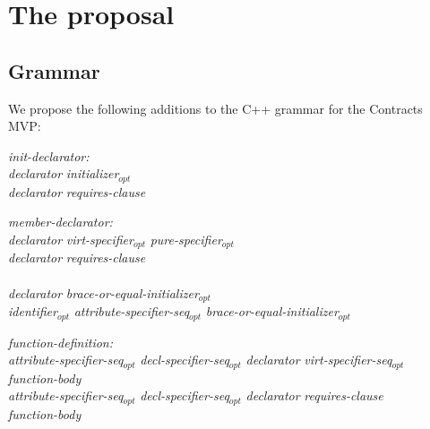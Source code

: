 
\section{The proposal}

\subsection{Grammar}

We propose the following additions to the C++ grammar for the Contracts MVP:

\begin{adjustwidth}{0.5cm}{0.5cm}

\emph{init-declarator:} \\
\phantom{~~~}\emph{declarator} \emph{initializer}$_{opt}$ \\
\phantom{~~~}\emph{declarator} \emph{requires-clause} \\
\phantom{~~~}

\emph{member-declarator:} \\
\phantom{~~~}\emph{declarator} \emph{virt-specifier}$_{opt}$ \emph{pure-specifier}$_{opt}$  \\
\phantom{~~~}\emph{declarator} \emph{requires-clause} \\
\phantom{~~~} \\
\phantom{~~~}\emph{declarator} \emph{brace-or-equal-initializer}$_{opt}$ \\
\phantom{~~~}\emph{identifier}$_{opt}$ \emph{attribute-specifier-seq}$_{opt}$ \tcode{:} \emph{brace-or-equal-initializer}$_{opt}$

\emph{function-definition:} \\
\phantom{~~~}\emph{attribute-specifier-seq}$_{opt}$ \emph{decl-specifier-seq}$_{opt}$ \emph{declarator} \emph{virt-specifier-seq}$_{opt}$  \\
\phantom{~~~~~~} \emph{function-body}\\
\phantom{~~~}\emph{attribute-specifier-seq}$_{opt}$ \emph{decl-specifier-seq}$_{opt}$ \emph{declarator} \emph{requires-clause} \\ 
\phantom{~~~~~~} \emph{function-body}


\end{adjustwidth}
